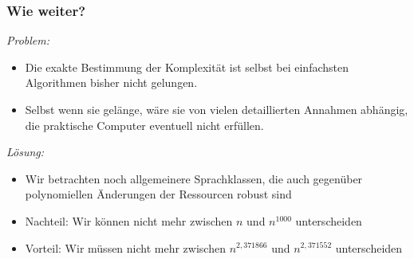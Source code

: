 \documentclass[aspectratio=1610,onlymath]{beamer}
\begin{document}
\begin{frame}\frametitle{Wie weiter?}


\emph{Problem:}
\begin{itemize}
\item Die exakte Bestimmung der Komplexität ist selbst bei einfachsten Algorithmen bisher nicht gelungen.
\item Selbst wenn sie gelänge, wäre sie von vielen detaillierten Annahmen abhängig, die praktische Computer eventuell nicht erfüllen.
\end{itemize}
\bigskip\pause

\emph{Lösung:}
\begin{itemize}
\item Wir betrachten \alert{noch allgemeinere Sprachklassen}, die auch gegenüber polynomiellen Änderungen der Ressourcen robust sind
\item Nachteil: Wir können nicht mehr zwischen $n$ und $n^{1000}$ unterscheiden
\item Vorteil: Wir müssen nicht mehr zwischen $n^{2,371866}$ und $n^{2,371552}$ unterscheiden
\end{itemize}

\end{frame}
\end{document}
